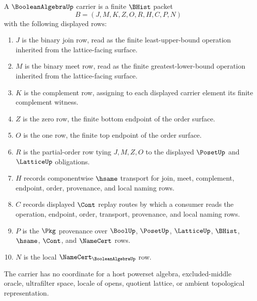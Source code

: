 \begin{definition}
\label{def:booleanalgebra-bhist-carrier}
A $\BooleanAlgebraUp$ carrier is a finite $\BHist$ packet
$$
B=(J,M,K,Z,O,R,H,C,P,N)
$$
with the following displayed rows:
\begin{enumerate}
\item $J$ is the binary join row, read as the finite least-upper-bound operation inherited from the lattice-facing surface.
\item $M$ is the binary meet row, read as the finite greatest-lower-bound operation inherited from the lattice-facing surface.
\item $K$ is the complement row, assigning to each displayed carrier element its finite complement witness.
\item $Z$ is the zero row, the finite bottom endpoint of the order surface.
\item $O$ is the one row, the finite top endpoint of the order surface.
\item $R$ is the partial-order row tying $J,M,Z,O$ to the displayed $\PosetUp$ and $\LatticeUp$ obligations.
\item $H$ records componentwise $\hsame$ transport for join, meet, complement, endpoint, order, provenance, and local naming rows.
\item $C$ records displayed $\Cont$ replay routes by which a consumer reads the operation, endpoint, order, transport, provenance, and local naming rows.
\item $P$ is the $\Pkg$ provenance over $\BoolUp$, $\PosetUp$, $\LatticeUp$, $\BHist$, $\hsame$, $\Cont$, and $\NameCert$ rows.
\item $N$ is the local $\NameCert_{\BooleanAlgebraUp}$ row.
\end{enumerate}
The carrier has no coordinate for a host powerset algebra, excluded-middle oracle, ultrafilter space, locale of opens, quotient lattice, or ambient topological representation.
\end{definition}

